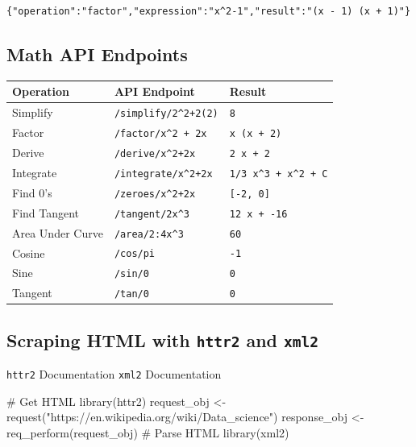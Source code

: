 \documentclass[
  letterpaper,
  DIV=11,
  numbers=noendperiod,
  oneside]{scrreprt}
\newenvironment{Shaded}{\begin{snugshade}}{\end{snugshade}}
\newcommand{\CommentTok}[1]{\textcolor[rgb]{0.37,0.37,0.37}{#1}}
\newcommand{\FunctionTok}[1]{\textcolor[rgb]{0.28,0.35,0.67}{#1}}
\newcommand{\NormalTok}[1]{\textcolor[rgb]{0.00,0.23,0.31}{#1}}
\newcommand{\OtherTok}[1]{\textcolor[rgb]{0.00,0.23,0.31}{#1}}
\newcommand{\StringTok}[1]{\textcolor[rgb]{0.13,0.47,0.30}{#1}}
\begin{document}
\begin{verbatim}
{"operation":"factor","expression":"x^2-1","result":"(x - 1) (x + 1)"}
\end{verbatim}

\hypertarget{math-api-endpoints}{%
\subsection{Math API Endpoints}\label{math-api-endpoints}}

\begin{longtable}[]{@{}lll@{}}
\toprule\noalign{}
Operation & API Endpoint & Result \\
\midrule\noalign{}
\endhead
\bottomrule\noalign{}
\endlastfoot
Simplify & \texttt{/simplify/2\^{}2+2(2)} & \texttt{8} \\
Factor & \texttt{/factor/x\^{}2\ +\ 2x} & \texttt{x\ (x\ +\ 2)} \\
Derive & \texttt{/derive/x\^{}2+2x} & \texttt{2\ x\ +\ 2} \\
Integrate & \texttt{/integrate/x\^{}2+2x} &
\texttt{1/3\ x\^{}3\ +\ x\^{}2\ +\ C} \\
Find 0's & \texttt{/zeroes/x\^{}2+2x} & \texttt{{[}-2,\ 0{]}} \\
Find Tangent & \texttt{/tangent/2\textbar{}x\^{}3} &
\texttt{12\ x\ +\ -16} \\
Area Under Curve & \texttt{/area/2:4\textbar{}x\^{}3} & \texttt{60} \\
Cosine & \texttt{/cos/pi} & \texttt{-1} \\
Sine & \texttt{/sin/0} & \texttt{0} \\
Tangent & \texttt{/tan/0} & \texttt{0} \\
\end{longtable}

\hypertarget{scraping-html-with-httr2-and-xml2}{%
\subsection{\texorpdfstring{Scraping HTML with \texttt{httr2} and
\texttt{xml2}}{Scraping HTML with httr2 and xml2}}\label{scraping-html-with-httr2-and-xml2}}

\texttt{httr2} Documentation \textbar{} \texttt{xml2} Documentation

\begin{Shaded}
\begin{Highlighting}[]
\CommentTok{\# Get HTML}
\FunctionTok{library}\NormalTok{(httr2)}
\NormalTok{request\_obj }\OtherTok{\textless{}{-}} \FunctionTok{request}\NormalTok{(}\StringTok{"https://en.wikipedia.org/wiki/Data\_science"}\NormalTok{)}
\NormalTok{response\_obj }\OtherTok{\textless{}{-}} \FunctionTok{req\_perform}\NormalTok{(request\_obj)}
\CommentTok{\# Parse HTML}
\FunctionTok{library}\NormalTok{(xml2)}
\end{Highlighting}
\end{Shaded}
\end{document}
